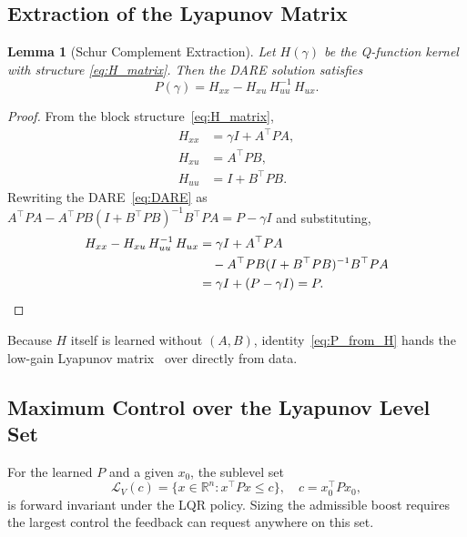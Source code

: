 \documentclass[final,5p,times,authoryear]{elsarticle}
\theoremstyle{plain}
\newtheorem{lemma}{Lemma}
\theoremstyle{definition}
\theoremstyle{remark}
\begin{document}
\subsection{Extraction of the Lyapunov Matrix}\label{sec:P_extraction}

\begin{lemma}[Schur Complement Extraction]\label{lemma:P}
Let $H(\gamma)$ be the Q-function kernel with structure
\eqref{eq:H_matrix}.  Then the DARE solution satisfies
\begin{equation}
P(\gamma) = H_{xx} - H_{xu}\, H_{uu}^{-1}\, H_{ux}.
\label{eq:P_from_H}
\end{equation}
\end{lemma}

\begin{proof}
From the block structure~\eqref{eq:H_matrix},
\begin{align}
H_{xx} &= \gamma I + A^\top PA, \label{eq:Hxx_expand} \\
H_{xu} &= A^\top PB,             \label{eq:Hxu_expand} \\
H_{uu} &= I + B^\top PB.         \label{eq:Huu_expand}
\end{align}
Rewriting the DARE~\eqref{eq:DARE} as
$A^\top PA - A^\top PB(I + B^\top PB)^{-1}B^\top PA = P - \gamma I$
and substituting,
\begin{align}
H_{xx} - H_{xu}\, H_{uu}^{-1}\, H_{ux}
  &= \gamma I + A^\top PA \notag \\
  &\quad - A^\top PB(I + B^\top PB)^{-1}B^\top PA \notag \\
  &= \gamma I + (P - \gamma I) = P. \qedhere
\end{align}
\end{proof}

Because $H$ itself is learned without $(A,B)$,
identity~\eqref{eq:P_from_H} hands the low-gain Lyapunov
matrix~\citep{Lin1998} over directly from data.

\subsection{Maximum Control over the Lyapunov Level Set}
\label{sec:Umax}

For the learned $P$ and a given $x_0$, the sublevel set
\begin{equation}
\mathcal{L}_V(c) = \{x \in \mathbb{R}^n : x^\top P x \leq c\},
\quad c = x_0^\top P x_0,
\end{equation}
is forward invariant under the LQR policy.  Sizing the admissible
boost requires the largest control the feedback can request anywhere
on this set.
\end{document}
